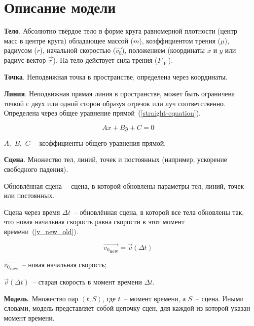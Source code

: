 \section{Описание модели}\label{model_1_3}

\textbf{Тело}. Абсолютно твёрдое тело в форме круга равномерной плотности
(центр масс в центре круга) обладающее массой (\(m\)), коэффициентом трения (\(\mu\)),
радиусом (\(r\)), начальной скоростью (\(\vec{v_0}\)), положением (координаты \(x\) и \(y\) или радиус-вектор \(\vec{r}\)).
На тело действует сила трения (\(F_\text{тр.}\)).

\textbf{Точка}. Неподвижная точка в пространстве, определена через координаты.

\textbf{Линия}. Неподвижная прямая линия в пространстве, может быть ограничена точкой с двух или
одной сторон образуя отрезок или луч соответственно. Определена через общее уравнение прямой~(\ref{straight-equation}).

\begin{equation}\label{straight-equation}
  Ax + By + C = 0
\end{equation}

\begin{Underequation}
  \(A\),~\(B\),~\(C\)~-- коэффициенты общего уравнения прямой.
\end{Underequation}

\textbf{Сцена}. Множество тел, линий, точек и постоянных (например, ускорение свободного падения).

Обновлённая сцена~-- сцена, в которой обновлены параметры тел, линий, точек или постоянных.

Сцена через время \(\Delta t\)~-- обновлённая сцена, в которой все тела обновлены так,
что новая начальная скорость равна скорости в этот момент времени~(\ref{v_new_old}).

\begin{equation}\label{v_new_old}
  \vec{{v_0}_\text{new}} = \vec{v}(\Delta t)
\end{equation}

\begin{Underequation}
  \(\vec{{v_0}_\text{new}}\)~-- новая начальная скорость;

  \(\vec{v}(\Delta t)\)~-- старая скорость в момент времени \(\Delta t\).
\end{Underequation}

\textbf{Модель}. Множество пар \((t, S)\), где \(t\)~-- момент времени, а \(S\)~-- сцена.
Иными словами, модель представляет собой цепочку сцен, для каждой из которой указан момент времени.

